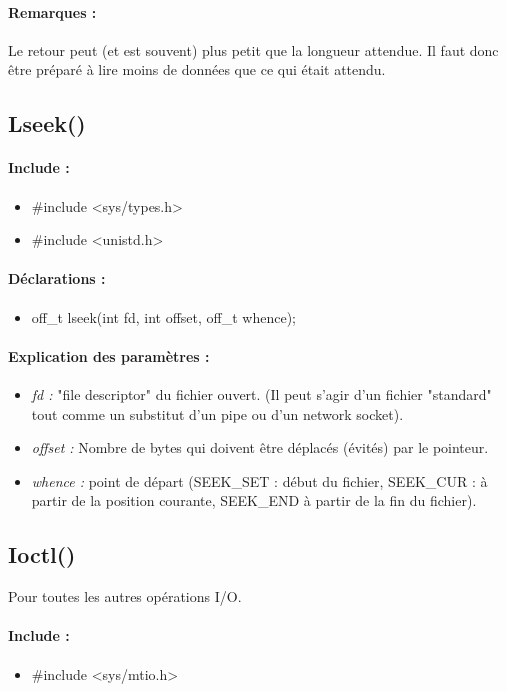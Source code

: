 \documentclass{article}[12pt]
\begin{document}
\paragraph{Remarques : }
Le retour peut (et est souvent) plus petit que la longueur attendue. Il faut donc être préparé à lire moins de données que ce qui était attendu. 
\subsection{Lseek()}
\paragraph{Include : }
\begin{itemize}
	\item \#include <sys/types.h>
	\item \#include <unistd.h>
\end{itemize}
\paragraph{Déclarations : }
\begin{itemize}
	\item off\_t lseek(int fd, int offset, off\_t whence);
\end{itemize}
\paragraph{Explication des paramètres : }
\begin{itemize}
	\item \emph{fd : } "file descriptor" du fichier ouvert. (Il peut s'agir d'un fichier "standard" tout comme un substitut d'un pipe ou d'un network socket).
	\item \emph{offset : } Nombre de bytes qui doivent être déplacés (évités) par le pointeur.
	\item \emph{whence : } point de départ (SEEK\_SET : début du fichier, SEEK\_CUR : à partir de la position courante, SEEK\_END à partir de la fin du fichier).
\end{itemize}
\subsection{Ioctl()}
Pour toutes les autres opérations I/O.
\paragraph{Include : }
\begin{itemize}
	\item \#include <sys/mtio.h>
\end{itemize}
\end{document}
